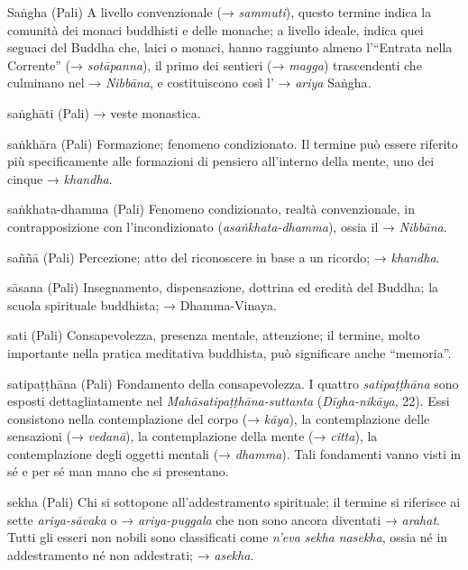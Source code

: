 \begin{glossarydescription}
\item[Saṅgha] (Pali) A livello convenzionale (→ \emph{sammuti}), questo termine
indica la comunità dei monaci buddhisti e delle monache; a livello
ideale, indica quei seguaci del Buddha che, laici o monaci, hanno
raggiunto almeno l'``Entrata nella Corrente'' (→ \emph{sotāpanna}), il
primo dei sentieri (→ \emph{magga}) trascendenti che culminano nel →
\emph{Nibbāna}, e costituiscono così l' → \emph{ariya} Saṅgha\emph{.}

\item[saṅghāti] (Pali) → veste monastica.

\item[saṅkhāra] (Pali) Formazione; fenomeno condizionato. Il termine può
essere riferito più specificamente alle formazioni di pensiero
all'interno della mente, uno dei cinque → \emph{khandha}.

\item[saṅkhata-dhamma] (Pali) Fenomeno condizionato, realtà convenzionale, in
contrapposizione con l'incondizionato (\emph{asaṅkhata-dhamma}), ossia
il → \emph{Nibbāna}.

\item[saññā] (Pali) Percezione; atto del riconoscere in base a un ricordo; →
\emph{khandha}.

\item[sāsana] (Pali) Insegnamento, dispensazione, dottrina ed eredità del
Buddha; la scuola spirituale buddhista; → Dhamma-Vinaya.

\item[sati] (Pali) Consapevolezza, presenza mentale, attenzione; il termine,
molto importante nella pratica meditativa buddhista, può significare
anche ``memoria''.

\item[satipaṭṭhāna] (Pali) Fondamento della consapevolezza. I quattro
\emph{satipaṭṭhāna} sono esposti dettagliatamente nel
\emph{Mahāsatipaṭṭhāna-suttanta} (\emph{Dīgha-nikāya}, 22). Essi
consistono nella contemplazione del corpo (→ \emph{kāya}), la
contemplazione delle sensazioni (→ \emph{vedanā}), la contemplazione
della mente (→ \emph{citta}), la contemplazione degli oggetti mentali (→
\emph{dhamma}). Tali fondamenti vanno visti in sé e per sé man mano che
si presentano.

\item[sekha] (Pali) Chi si sottopone all'addestramento spirituale; il termine
si riferisce ai sette \emph{ariya-sāvaka} o → \emph{ariya-puggala} che
non sono ancora diventati → \emph{arahat}. Tutti gli esseri non nobili
sono classificati come \emph{n'eva sekha nasekha}, ossia né in
addestramento né non addestrati; → \emph{asekha}.


\end{glossarydescription}
